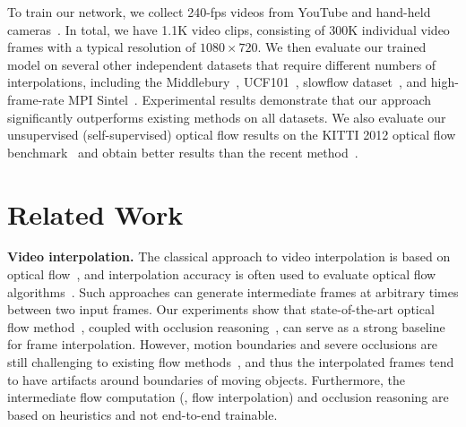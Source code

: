 \documentclass[10pt,twocolumn,letterpaper]{article}
\makeatletter
\newcommand{\vjcomment}[1]{{\color{green}VJ: #1}}
\def\fps{-fps\@\xspace}
\makeatother
\begin{document}
To train our network, we collect 240\fps videos from YouTube and hand-held cameras~\cite{su16deep}.
In total, we have 1.1K video clips, consisting of 300K individual video frames with a typical resolution of $1080\times 720$. We then evaluate our trained model on several other independent datasets that  require different numbers of interpolations, including the Middlebury~\cite{baker11a}, UCF101~\cite{ucf101},  slowflow dataset~\cite{Janai2017CVPR}, and high-frame-rate MPI Sintel~\cite{Janai2017CVPR}. Experimental results demonstrate that our approach significantly outperforms existing methods on all datasets. We also evaluate our unsupervised (self-supervised) optical flow results on the KITTI 2012 optical flow benchmark~\cite{Geiger:2012:KITTI} and obtain better results than the recent method~\cite{liu17video}.



\section{Related Work}
\noindent\textbf{Video interpolation.} %
The classical approach to video interpolation is based on optical flow~\cite{Baker2009OcclusionInterpolation,Barron:1994:PO}, and interpolation accuracy is often used to evaluate optical flow algorithms~\cite{baker11a,szeliski1999prediction}. Such approaches can generate intermediate frames at arbitrary times between two input frames. 
Our experiments show that state-of-the-art optical flow method~\cite{ilg16flownet2}, coupled with occlusion reasoning~\cite{baker11a}, can serve as a strong baseline for frame interpolation. However, motion boundaries and severe occlusions are still challenging to existing flow methods~\cite{Butler:ECCV:2012,Geiger:2012:KITTI}, and thus the interpolated frames tend to have artifacts around boundaries of moving objects. Furthermore, the intermediate flow computation (\ie, flow interpolation) and occlusion reasoning are based on heuristics and not end-to-end trainable. 
\end{document}
